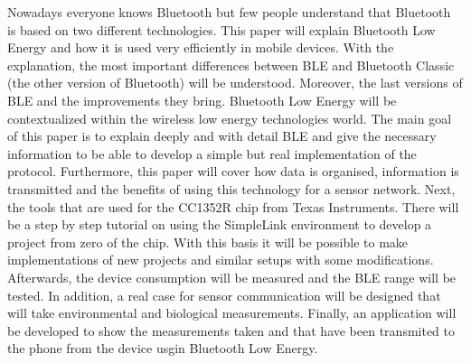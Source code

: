 \documentclass[catalan,final]{setup/eetac_tfc_pfc}
\begin{document}
\begin{overview}{1cm}
Nowadays everyone knows Bluetooth but few people understand that Bluetooth is based on two different technologies. This paper will explain Bluetooth Low Energy and how it is used very efficiently in mobile devices.
\newline
\newline
With the explanation, the most important differences between BLE and Bluetooth Classic (the other version of Bluetooth) will be understood. Moreover, the last versions of BLE and the improvements they bring.
Bluetooth Low Energy will be contextualized within the wireless low energy technologies world.
\newline
\newline
The main goal of this paper is to explain deeply and with detail BLE and give the necessary information to be able to develop a simple but real implementation of the protocol. 
Furthermore, this paper will cover how data is organised, information is transmitted and the benefits of using this technology for a sensor network.
\newline
\newline
Next, the tools that are used for the CC1352R chip from Texas Instruments.
There will be a step by step tutorial on using the SimpleLink environment to develop a project from zero of the chip.
With this basis it will be possible to make implementations of new projects and similar setups with some modifications. 
\newline
\newline
Afterwards, the device consumption will be measured and the BLE range will be tested.
In addition, a real case for sensor communication will be designed that will take environmental and biological measurements.
Finally, an application will be developed to show the measurements taken and that have been transmited to the phone from the device usgin Bluetooth Low Energy.
\end{overview}


\end{document}
